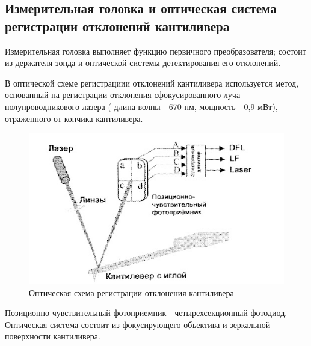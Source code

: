 \documentclass[a4paper,12pt]{article}
\theoremstyle{plain} %
\theoremstyle{definition} %
\theoremstyle{remark} %
\begin{document}
\subsection{Измерительная головка и оптическая система регистрации отклонений кантиливера }
Измерительная головка выполняет функцию первичного преобразователя; состоит из держателя зонда и оптической системы детектирования его отклонений.


В оптической схеме регистрациии отклонений кантиливера используется метод, основанный на регистрации отклонения сфокусированного луча полупроводникового лазера ( длина волны - 670 нм, мощность - 0,9 мВт), отраженного от кончика кантиливера. 
\begin{figure}[h!]
	\centering
	\includegraphics[scale=0.6]{pic5.jpg}
	\caption{ Оптическая схема регистрации отклонения кантиливера}
	\label{pic5}
\end{figure}
Позиционно-чувствительный фотоприемник - четырехсекционный фотодиод. Оптическая система состоит из фокусирующего объектива и зеркальной поверхности кантиливера. 
\end{document}
